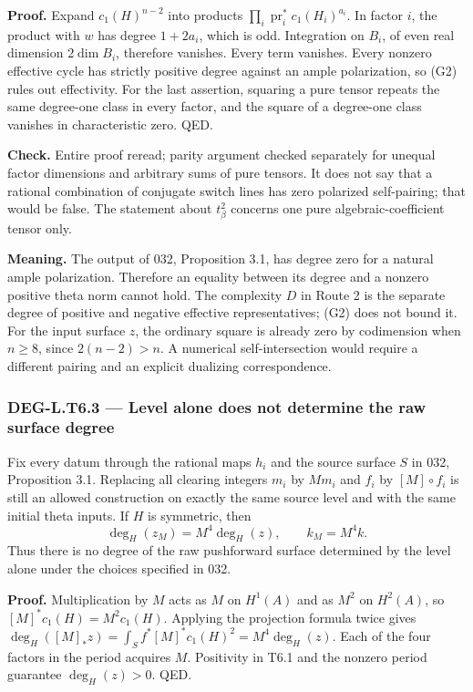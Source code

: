 \documentclass[11pt,a4paper]{article}
\theoremstyle{definition}
\begin{document}
\textbf{Proof.} Expand \(c_1(H)^{n-2}\) into products \(\prod_i\operatorname{pr}_i^*c_1(H_i)^{a_i}\). In factor \(i\), the product with \(w\) has degree \(1+2a_i\), which is odd. Integration on \(B_i\), of even real dimension \(2\dim B_i\), therefore vanishes. Every term vanishes. Every nonzero effective cycle has strictly positive degree against an ample polarization, so (G2) rules out effectivity. For the last assertion, squaring a pure tensor repeats the same degree-one class in every factor, and the square of a degree-one class vanishes in characteristic zero. QED.

\textbf{Check.} Entire proof reread; parity argument checked separately for unequal factor dimensions and arbitrary sums of pure tensors. It does not say that a rational combination of conjugate switch lines has zero polarized self-pairing; that would be false. The statement about \(t_\beta^2\) concerns one pure algebraic-coefficient tensor only.

\textbf{Meaning.} The output of 032, Proposition 3.1, has degree zero for a natural ample polarization. Therefore an equality between its degree and a nonzero positive theta norm cannot hold. The complexity \(D\) in Route 2 is the separate degree of positive and negative effective representatives; (G2) does not bound it. For the input surface \(z\), the ordinary square is already zero by codimension when \(n\ge8\), since \(2(n-2)>n\). A numerical self-intersection would require a different pairing and an explicit dualizing correspondence.

\subsubsection{DEG-L.T6.3 --- Level alone does not determine the raw surface degree}\label{DEG-L.T6.3}

Fix every datum through the rational maps \(h_i\) and the source surface \(S\) in 032, Proposition 3.1. Replacing all clearing integers \(m_i\) by \(Mm_i\) and \(f_i\) by \([M]\circ f_i\) is still an allowed construction on exactly the same source level and with the same initial theta inputs. If \(H\) is symmetric, then \[
\deg_H(z_M)=M^4\deg_H(z),\qquad k_M=M^4k.
\tag{G3}
\] Thus there is no degree of the raw pushforward surface determined by the level alone under the choices specified in 032.

\textbf{Proof.} Multiplication by \(M\) acts as \(M\) on \(H^1(A)\) and as \(M^2\) on \(H^2(A)\), so \([M]^*c_1(H)=M^2c_1(H)\). Applying the projection formula twice gives \(\deg_H([M]_*z)=\int_S f^*[M]^*c_1(H)^2=M^4\deg_H(z)\). Each of the four factors in the period acquires \(M\). Positivity in T6.1 and the nonzero period guarantee \(\deg_H(z)>0\). QED.
\end{document}
